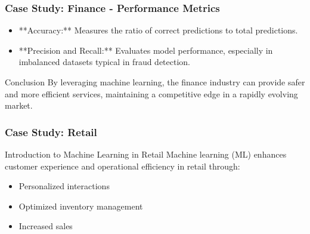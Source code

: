 \documentclass[aspectratio=169]{beamer}
\begin{document}
\begin{frame}
    \frametitle{Case Study: Finance - Performance Metrics}
    \begin{itemize}
        \item **Accuracy:** Measures the ratio of correct predictions to total predictions.
        \item **Precision and Recall:** Evaluates model performance, especially in imbalanced datasets typical in fraud detection.
    \end{itemize}
    
    \begin{block}{Conclusion}
        By leveraging machine learning, the finance industry can provide safer and more efficient services, maintaining a competitive edge in a rapidly evolving market.
    \end{block}
\end{frame}

\begin{frame}[fragile]
    \frametitle{Case Study: Retail}
    \begin{block}{Introduction to Machine Learning in Retail}
        Machine learning (ML) enhances customer experience and operational efficiency in retail through:
        \begin{itemize}
            \item Personalized interactions
            \item Optimized inventory management
            \item Increased sales
        \end{itemize}
    \end{block}
\end{frame}
\end{document}
